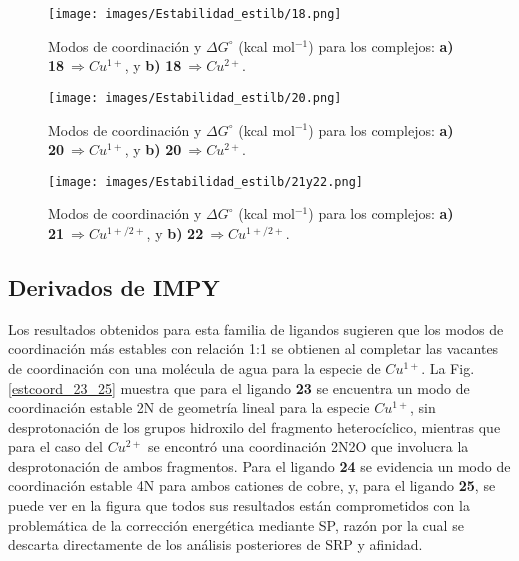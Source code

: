\begin{figure}[ht] 
\centering
\texttt{[image: images/Estabilidad\_estilb/18.png]}
\caption{Modos de coordinación y $\Delta G^{\circ}$ (kcal mol$^{-1}$) para los complejos: \textbf{a)} \textbf{18}$\ \Rightarrow Cu^{1+}$, y \textbf{b)} \textbf{18}$\ \Rightarrow Cu^{2+}$.}
\label{estcoord_18}
\end{figure}

\begin{figure}[ht] 
\centering
\centerline{\texttt{[image: images/Estabilidad\_estilb/20.png]}}
\caption{Modos de coordinación y $\Delta G^{\circ}$ (kcal mol$^{-1}$) para los complejos: \textbf{a)} \textbf{20}$\ \Rightarrow Cu^{1+}$, y \textbf{b)} \textbf{20}$\ \Rightarrow Cu^{2+}$.}
\label{estcoord_20}
\end{figure}

\begin{figure}[ht] 
\centering
\centerline{\texttt{[image: images/Estabilidad\_estilb/21y22.png]}}
\caption{Modos de coordinación y $\Delta G^{\circ}$ (kcal mol$^{-1}$) para los complejos: \textbf{a)} \textbf{21}$\ \Rightarrow Cu^{1+/2+}$, y \textbf{b)} \textbf{22}$\ \Rightarrow Cu^{1+/2+}$.}
\label{estcoord_21y22}
\end{figure}

\clearpage

\subsection{Derivados de IMPY}

Los resultados obtenidos para esta familia de ligandos sugieren que los modos de coordinación más estables con relación 1:1 se obtienen al completar las vacantes de coordinación con una molécula de agua para la especie de $Cu^{1+}$. La Fig. \ref{estcoord_23_25} muestra que para el ligando \textbf{23} se encuentra un modo de coordinación estable 2N de geometría lineal para la especie $Cu^{1+}$, sin desprotonación de los grupos hidroxilo del fragmento heterocíclico, mientras que para el caso del $Cu^{2+}$ se encontró una coordinación 2N2O que involucra la desprotonación de ambos fragmentos. Para el ligando \textbf{24} se evidencia un modo de coordinación estable 4N para ambos cationes de cobre, y, para el ligando \textbf{25}, se puede ver en la figura que todos sus resultados están comprometidos con la problemática de la corrección energética mediante SP, razón por la cual se descarta directamente de los análisis posteriores de SRP y afinidad.

